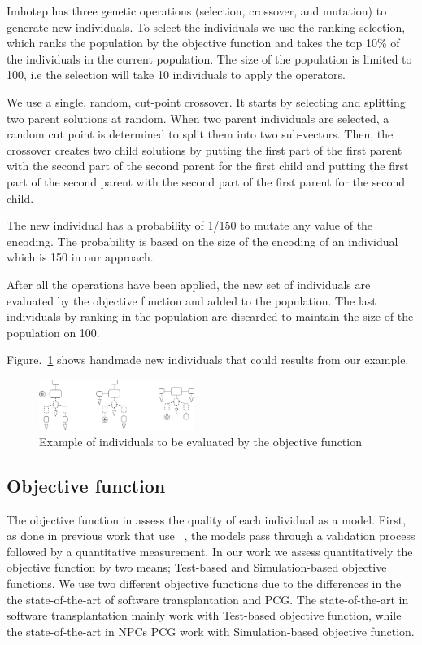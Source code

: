 Imhotep has three genetic operations (selection, crossover, and mutation) to generate new individuals. To select the individuals we use the ranking selection, which ranks the population by the objective function and takes the top 10\% of the individuals in the current population. The size of the population is limited to 100, i.e the selection will take 10 individuals to apply the operators.

We use a single, random, cut-point crossover. It starts by selecting and splitting two parent solutions at random. When two parent individuals are selected, a random cut point is determined to split them into two sub-vectors.
Then, the crossover creates two child solutions by putting the first part of the first parent with the second part of the second parent for the first child and putting the first part of the second parent with the second part of the first parent for the second child.

The new individual has a probability of 1/150 to mutate any value of the encoding. The probability is based on the size of the encoding of an individual which is 150 in our approach.

After all the operations have been applied, the new set of individuals are evaluated by the objective function and added to the population. The last individuals by ranking in the population are discarded to maintain the size of the population on 100. 

Figure.~\ref{fig:candidates} shows handmade new individuals that could results from our example.

\begin{figure}[h]
    \centering
    \includegraphics[width=0.45\textwidth]{Figures/candidates.png}
    \caption{Example of individuals to be evaluated by the objective function}
    \label{fig:candidates}
\end{figure}

\subsection{Objective function}

The objective function in \ApproachName{} assess the quality of each individual as a model. First, as done in previous work that use \CaseStudy{}~\cite{blasco2021evolutionary}, the models pass through a validation process followed by a quantitative measurement. In our work we assess quantitatively the objective function by two means; Test-based and Simulation-based objective functions. We use two different objective functions due to the differences in the the state-of-the-art of software transplantation and PCG. The state-of-the-art in software transplantation mainly work with Test-based objective function, while the state-of-the-art in NPCs PCG work with Simulation-based objective function.

